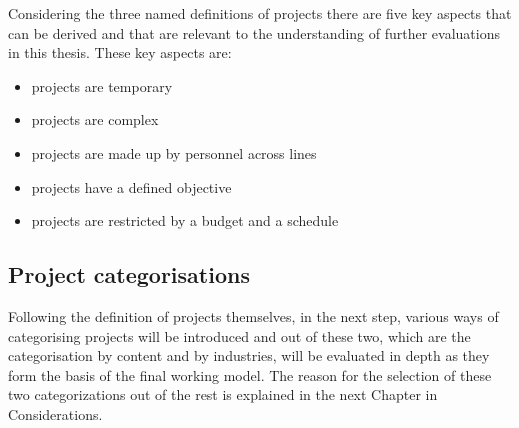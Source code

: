 Considering the three named definitions of projects there are five key aspects that can be derived and that are relevant to the understanding of further evaluations in this thesis. These key aspects are:
\begin{itemize}[noitemsep]
    \item projects are temporary
    \item projects are complex
    \item projects are made up by personnel across lines
    \item projects have a defined objective
    \item projects are restricted by a budget and a schedule
\end{itemize}

\subsection{Project categorisations}
Following the definition of projects themselves, in the next step, various ways of categorising projects will be introduced and out of these two, which are the categorisation by content and by industries, will be evaluated in depth as they form the basis of the final working model. The reason for the selection of these two categorizations out of the rest is explained in the next Chapter in Considerations. 

